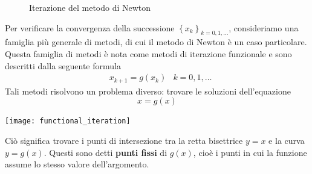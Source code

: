 \documentclass{article}
\begin{document}
\begin{figure}[ht]
    \centering
    \caption{Iterazione del metodo di Newton}
\end{figure}

Per verificare la convergenza della successione
$\left\{x_k\right\}_{k=0,1,\ldots}$, consideriamo una famiglia più generale di
metodi, di cui il metodo di Newton è un caso particolare. Questa famiglia di
metodi è nota come metodi di iterazione funzionale e sono descritti dalla
seguente formula
\begin{equation}\label{eq:metodo_iterazione_funzionale}
  \begin{aligned}
      & x_{k+1}=g(x_k) & k=0,1,\ldots
  \end{aligned}  
\end{equation}
Tali metodi risolvono un problema diverso: trovare le soluzioni dell'equazione 
$$x=g(x)$$
\begin{center}
    \texttt{[image: functional\_iteration]}
\end{center}
Ciò significa trovare i punti di intersezione tra la retta bisettrice $y=x$ e
la curva $y=g(x)$. Questi sono detti \textbf{punti fissi} di $g(x)$, cioè i punti in cui la funzione
assume lo stesso valore dell'argomento.
\end{document}
